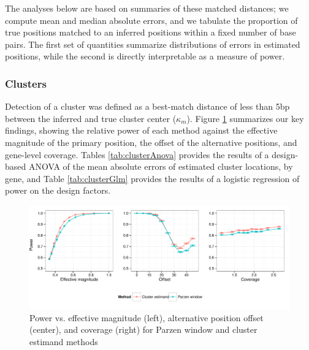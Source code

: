The analyses below are based on summaries of these matched distances; we compute mean and median absolute errors, and we tabulate the proportion of true positions matched to an inferred positions within a fixed number of base pairs.
The first set of quantities summarize distributions of errors in estimated positions, while the second is directly interpretable as a measure of power.

\subsubsection{Clusters}
\label{sec:clusterPower}

Detection of a cluster was defined as a best-match distance of less than 5bp between the inferred and true cluster center ($\kappa_m$).
Figure \ref{fig:powerCluster} summarizes our key findings, showing the relative power of each method against the effective magnitude of the primary position, the offset of the alternative positions, and gene-level coverage.
Tables \ref{tab:clusterAnova} provides the results of a design-based ANOVA of the mean absolute errors of  estimated cluster locations, by gene, and Table \ref{tab:clusterGlm} provides the results of a logistic regression of power on the design factors.
%
\ifx\nofigures\undefined
\begin{figure}
\centering
\includegraphics[width=\textwidth]{figures/nucleosomes/figure_power_cluster_3-panel}
\caption{Power vs. effective magnitude (left), alternative position offset (center), and coverage (right) for Parzen window and cluster estimand methods \label{fig:powerCluster}}
\end{figure}
%
